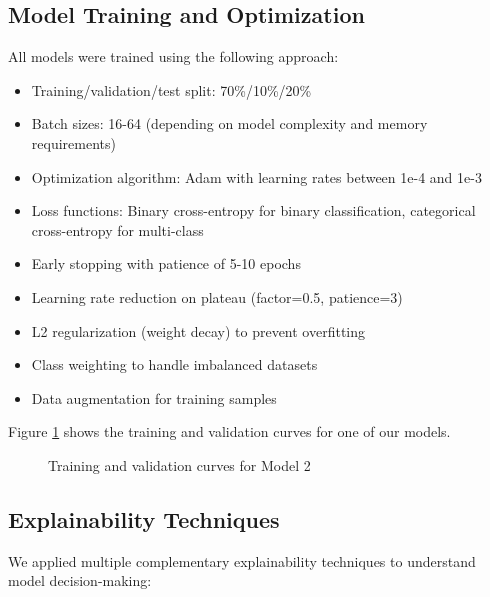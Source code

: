 \documentclass[conference,compsoc]{IEEEtran}
\begin{document}
\subsection{Model Training and Optimization}
All models were trained using the following approach:
\begin{itemize}
    \item Training/validation/test split: 70\%/10\%/20\%
    \item Batch sizes: 16-64 (depending on model complexity and memory requirements)
    \item Optimization algorithm: Adam with learning rates between 1e-4 and 1e-3
    \item Loss functions: Binary cross-entropy for binary classification, categorical cross-entropy for multi-class
    \item Early stopping with patience of 5-10 epochs
    \item Learning rate reduction on plateau (factor=0.5, patience=3)
    \item L2 regularization (weight decay) to prevent overfitting
    \item Class weighting to handle imbalanced datasets
    \item Data augmentation for training samples
\end{itemize}

Figure \ref{fig:training_curves} shows the training and validation curves for one of our models.

\begin{figure}[htbp]
\centering
\begin{minipage}{0.8\textwidth}
\end{minipage}
\caption{Training and validation curves for Model 2}
\label{fig:training_curves}
\end{figure}

\subsection{Explainability Techniques}
We applied multiple complementary explainability techniques to understand model decision-making:
\end{document}
